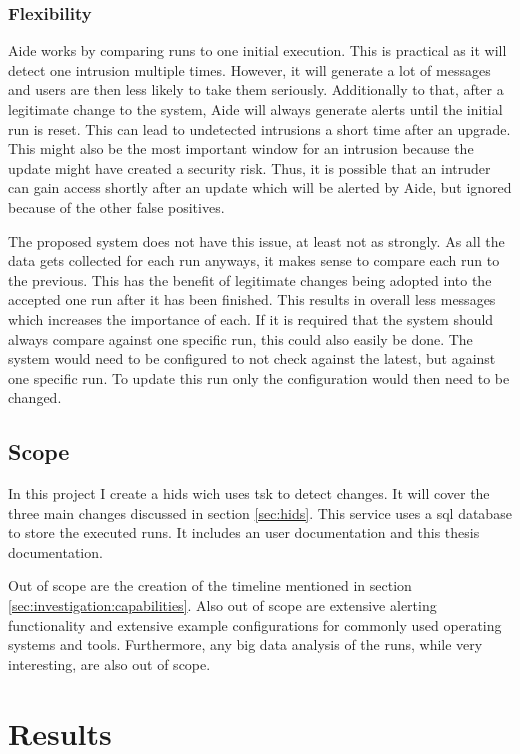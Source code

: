 \documentclass[
	a4paper,					%
	10pt,							%
	twoside,					%
	openright,				%
	notitlepage,			%
	parskip=half,			%
]{scrreprt}					%
\begin{document}
\subsection{Flexibility}

Aide works by comparing runs to one initial execution. This is practical as it will detect one intrusion multiple times. However, it will generate a lot of messages and users are then less likely to take them seriously. Additionally to that, after a legitimate change to the system, Aide will always generate alerts until the initial run is reset. This can lead to undetected intrusions a short time after an upgrade. This might also be the most important window for an intrusion because the update might have created a security risk. Thus, it is possible that an intruder can gain access shortly after an update which will be alerted by Aide, but ignored because of the other false positives.

The proposed system does not have this issue, at least not as strongly. As all the data gets collected for each run anyways, it makes sense to compare each run to the previous. This has the benefit of legitimate changes being adopted into the accepted one run after it has been finished. This results in overall less messages which increases the importance of each. If it is required that the system should always compare against one specific run, this could also easily be done. The system would need to be configured to not check against the latest, but against one specific run. To update this run only the configuration would then need to be changed. 

\section{Scope}

In this project I create a \gls{hids} wich uses \gls{tsk} to detect changes. It will cover the three main changes discussed in section \ref{sec:hids}. This service uses a \gls{sql} database to store the executed runs. It includes an user documentation and this thesis documentation. 

Out of scope are the creation of the timeline mentioned in section \ref{sec:investigation:capabilities}. Also out of scope are extensive alerting functionality and extensive example configurations for commonly used operating systems and tools. Furthermore, any big data analysis of the runs, while very interesting, are also out of scope.


\chapter{Results}
\end{document}
